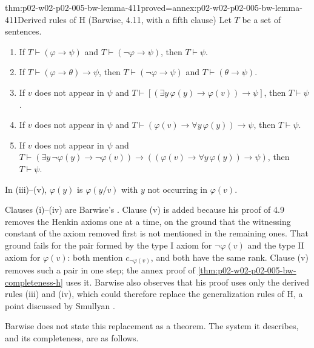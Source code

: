 \begin{hblemma}{thm:p02-w02-p02-005-bw-lemma-411}{proved=annex:p02-w02-p02-005-bw-lemma-411}{Derived rules of H (Barwise, 4.11, with a fifth clause)}
Let \(T\) be a set of sentences.
\begin{enumerate}
\item[(i)] If \(T\vdash(\varphi\to\psi)\) and \(T\vdash(\neg\varphi\to\psi)\),
      then \(T\vdash\psi\).
\item[(ii)] If \(T\vdash(\varphi\to\theta)\to\psi\), then
      \(T\vdash(\neg\varphi\to\psi)\) and \(T\vdash(\theta\to\psi)\).
\item[(iii)] If \(v\) does not appear in \(\psi\) and
      \(T\vdash[(\exists y\,\varphi(y)\to\varphi(v))\to\psi]\), then
      \(T\vdash\psi\).
\item[(iv)] If \(v\) does not appear in \(\psi\) and
      \(T\vdash(\varphi(v)\to\forall y\,\varphi(y))\to\psi\), then
      \(T\vdash\psi\).
\item[(v)] If \(v\) does not appear in \(\psi\) and
      \(T\vdash(\exists y\,\neg\varphi(y)\to\neg\varphi(v))\to
      ((\varphi(v)\to\forall y\,\varphi(y))\to\psi)\), then \(T\vdash\psi\).
\end{enumerate}
In (iii)--(v), \(\varphi(y)\) is \(\varphi(y/v)\) with \(y\) not occurring
in \(\varphi(v)\).
\end{hblemma}

Clauses (i)--(iv) are Barwise's \cite[ch.~A.1, \S4, 4.11, p.~35]{Barwise1977FirstOrder}.
Clause (v) is added because his proof of 4.9 removes the Henkin axioms one
at a time, on the ground that the witnessing constant of the axiom
removed first is not mentioned in the remaining ones.  That ground fails
for the pair formed by the type I axiom for \(\neg\varphi(v)\) and the type
II axiom for \(\varphi(v)\): both mention \(c_{\neg\varphi(v)}\), and both
have the same rank.  Clause (v) removes such a pair in one step; the annex
proof of \cref{thm:p02-w02-p02-005-bw-completeness-h} uses it.  Barwise
also observes that his proof uses only the derived rules (iii) and (iv),
which could therefore replace the generalization rules of H, a point
discussed by Smullyan \cite[ch.~A.1, \S4, p.~37]{Barwise1977FirstOrder}.

Barwise does not state this replacement as a theorem.  The system it
describes, and its completeness, are as follows.

